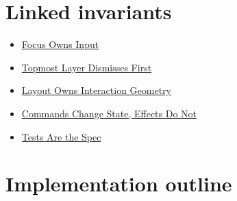\section{Linked invariants}\label{record-152-linked-invariants}

\begin{itemize}
\tightlist
\item
  \href{https://github.com/flyingrobots/bijou/blob/cbd70612140e7a450d764b3c7be1c6af878b99bc/docs/invariants/focus-owns-input.md}{Focus Owns Input}
\item
  \href{https://github.com/flyingrobots/bijou/blob/cbd70612140e7a450d764b3c7be1c6af878b99bc/docs/invariants/topmost-layer-dismisses-first.md}{Topmost Layer Dismisses First}
\item
  \href{https://github.com/flyingrobots/bijou/blob/cbd70612140e7a450d764b3c7be1c6af878b99bc/docs/invariants/layout-owns-interaction-geometry.md}{Layout Owns Interaction Geometry}
\item
  \href{https://github.com/flyingrobots/bijou/blob/cbd70612140e7a450d764b3c7be1c6af878b99bc/docs/invariants/commands-change-state-effects-do-not.md}{Commands Change State, Effects Do Not}
\item
  \href{https://github.com/flyingrobots/bijou/blob/cbd70612140e7a450d764b3c7be1c6af878b99bc/docs/invariants/tests-are-the-spec.md}{Tests Are the Spec}
\end{itemize}

\section{Implementation outline}\label{record-152-implementation-outline}

